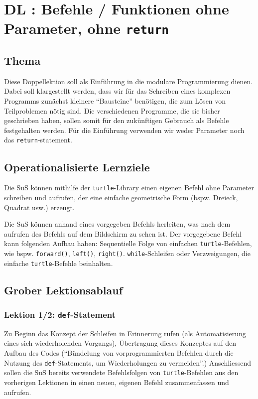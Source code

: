 \section{DL \themycounter: Befehle / Funktionen ohne Parameter, ohne \texorpdfstring{\lstinline|return|}{return}}
\begin{myExBox}[title=DL \themycounter]
\subsection*{Thema}
Diese Doppellektion soll als Einführung in die modulare Programmierung dienen. Dabei soll klargestellt werden, dass wir für das Schreiben eines komplexen Programms zunächst kleinere ``Bausteine'' benötigen, die zum Lösen von Teilproblemen nötig sind. Die verschiedenen Programme, die sie bisher geschrieben haben, sollen somit für den zukünftigen Gebrauch als Befehle festgehalten werden. Für die Einführung verwenden wir weder Parameter noch das \lstinline|return|-statement.

\subsection*{Operationalisierte Lernziele}
\begin{todolist}
    \item Die SuS können mithilfe der \lstinline|turtle|-Library einen eigenen Befehl ohne Parameter schreiben und aufrufen, der eine einfache geometrische Form (bspw. Dreieck, Quadrat usw.) erzeugt.
    \item Die SuS können anhand eines vorgegeben Befehls herleiten, was nach dem aufrufen des Befehls auf dem Bildschirm zu sehen ist. Der vorgegebene Befehl kann folgenden Aufbau haben: Sequentielle Folge von einfachen \lstinline|turtle|-Befehlen, wie bspw. \lstinline|forward()|, \lstinline|left()|, \lstinline|right()|. \lstinline|while|-Schleifen oder Verzweigungen, die einfache \lstinline|turtle|-Befehle beinhalten.
\end{todolist}

\subsection*{Grober Lektionsablauf}
\subsubsection*{Lektion 1/2:  \lstinline|def|-Statement}
Zu Beginn das Konzept der Schleifen in Erinnerung rufen (als Automatisierung eines sich wiederholenden Vorgangs), Übertragung dieses Konzeptes auf den Aufbau des Codes (``Bündelung von vorprogrammierten Befehlen durch die Nutzung des \lstinline|def|-Statements, um Wiederholungen zu vermeiden''.) Anschliessend sollen die SuS bereits verwendete Befehlsfolgen von \lstinline|turtle|-Befehlen aus den vorherigen Lektionen in einen neuen, eigenen Befehl zusammenfassen und aufrufen. 


\end{myExBox}
